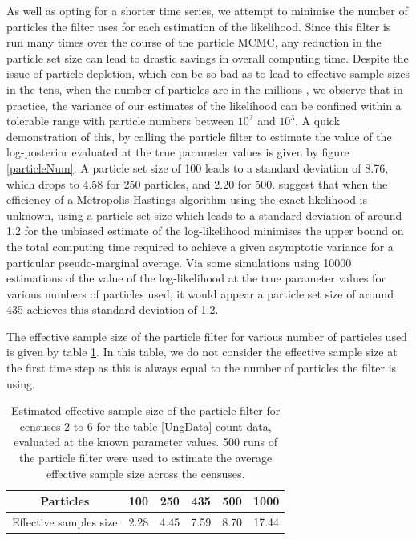 \documentclass[a4paper,12pt]{article}
\begin{document}
As well as opting for a shorter time series, we attempt to minimise the number of particles the filter uses for each estimation of the likelihood. Since this filter is run many times over the course of the particle MCMC, any reduction in the particle set size can lead to drastic savings in overall computing time. Despite the issue of particle depletion, which can be so bad as to lead to effective sample sizes in the tens, when the number of particles are in the millions \citep{Newman}, we observe that in practice, the variance of our estimates of the likelihood can be confined within a tolerable range with particle numbers between $10^2$ and $10^3$. A quick demonstration of this, by calling the particle filter to estimate the value of the log-posterior evaluated at the true parameter values is given by figure \ref{particleNum}. A particle set size of 100 leads to a standard deviation of 8.76, which drops to 4.58 for 250 particles, and 2.20 for 500. \citet{DoucetEfficient} suggest that when the efficiency of a Metropolis-Hastings algorithm using the exact likelihood is unknown, using a particle set size which leads to a standard deviation of around 1.2 for the unbiased estimate of the log-likelihood minimises the upper bound on the total computing time required to achieve a given asymptotic variance for a particular pseudo-marginal average. Via some simulations using 10000 estimations of the value of the log-likelihood at the true parameter values for various numbers of particles used, it would appear a particle set size of around 435 achieves this standard deviation of 1.2.

The effective sample size of the particle filter for various number of particles used is given by table \ref{ESS}. In this table, we do not consider the effective sample size at the first time step as this is always equal to the number of particles the filter is using.

\begin{table}[H]
\centering
\begin{tabular}{cccccc}
  \hline
 Particles & 100 & 250 & 435 & 500 & 1000\\ 
  \hline
 Effective samples size & 2.28 & 4.45 & 7.59 & 8.70 & 17.44 \\
   \hline
\end{tabular}
\caption{\label{ESS}Estimated effective sample size of the particle filter for censuses 2 to 6 for the table \ref{UngData} count data, evaluated at the known parameter values. 500 runs of the particle filter were used to estimate the average effective sample size across the censuses.}
\end{table}
\end{document}
